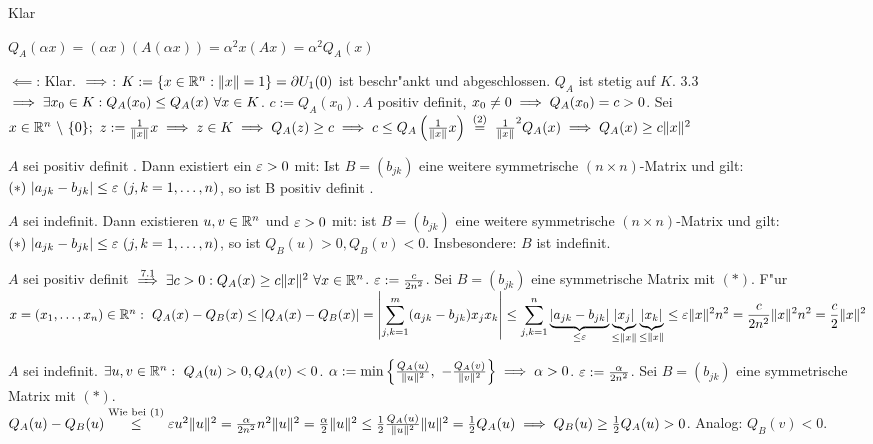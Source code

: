 \documentclass[a4paper,twoside,DIV15,BCOR12mm,chapterprefix=true,headings=twolinechapter]{scrbook}
\begin{document}
\begin{beweise}
\item Klar
\item $Q_A(\alpha x)=(\alpha x)(A(\alpha x))=\alpha^2x(Ax)=\alpha^2Q_A(x)$
\item \glqq$\impliedby$\grqq: Klar. \glqq$\implies$\grqq: $K:=\{x\in\mathbb{R}^n: \|x\|=1\}=\partial U_1(0)$ ist beschr"ankt und abgeschlossen. $Q_A$ ist stetig auf $K$. 3.3 $\implies\exists x_0\in K: Q_A(x_0)\le Q_A(x)\ \forall x\in K$. $c:=Q_A(x_0).\ A$ positiv definit, $x_0\ne 0\implies Q_A(x_0)=c>0$. Sei $x\in\MdR^n\ \backslash\ \{0\};\ z:=\frac{1}{\|x\|}x\folgt z\in K\folgt Q_A(z)\ge c\folgt c \le Q_A\left(\frac{1}{\|x\|}x\right)\gleichnach{(2)}\frac{1}{\|x\|}^2Q_A(x)\folgt Q_A(x)\ge c\|x\|^2$
\end{beweise}

\begin{satz}
\begin{liste}
\item $A$ sei positiv definit . Dann existiert ein $\varepsilon>0$ mit: Ist $B=(b_{jk})$ eine weitere symmetrische $(n\times n)$-Matrix und gilt: $(*)\ |a_{jk}-b_{jk}|\le\ep\ (j,k=1,\ldots, n)$, so ist B positiv definit .
\item $A$ sei indefinit. Dann existieren $u,v\in\mathbb{R}^n$ und $\varepsilon>0$ mit: ist $B=(b_{jk})$ eine weitere symmetrische $(n\times n)$-Matrix und gilt: $(*)\ |a_{jk}-b_{jk}|\le\ep\ (j,k=1,\ldots,n)$, so ist $Q_B(u)>0, Q_B(v)<0$. Insbesondere: $B$ ist indefinit.
\end{liste}
\end{satz}

\begin{beweise}
\item $A$ sei positiv definit $\folgtnach{7.1}\exists c>0: Q_A(x)\ge c\|x\|^2\ \forall x\in\MdR^n$. $\varepsilon:=\frac{c}{2n^2}$. Sei $B=(b_{jk})$ eine symmetrische Matrix mit $(*)$. F"ur $x=(x_1,\ldots,x_n)\in\MdR^n:\ Q_A(x)-Q_B(x)\le|Q_A(x)-Q_B(x)|=\left|\ds\sum_{j,k=1}^m(a_{jk}-b_{jk})x_jx_k\right|\le\ds\sum_{j,k=1}^n\underbrace{|a_{jk}-b_{jk}|}_{\le\ep}\underbrace{|x_j|}_{\le\|x\|}\underbrace{|x_k|}_{\le\|x\|}\le\ep\|x\|^2n^2=\frac{c}{2n^2}\|x\|^2n^2=\frac{c}{2}\|x\|^2$
\item $A$ sei indefinit. $\exists u,v\in\MdR^n:\ Q_A(u)>0, Q_A(v)<0$. $\alpha:=\min\left\{\frac{Q_A(u)}{\|u\|^2},\ -\frac{Q_A(v)}{\|v\|^2}\right\}\folgt\alpha>0$. $\varepsilon:=\frac{\alpha}{2n^2}$. Sei $B=(b_{jk})$ eine symmetrische Matrix mit $(*)$.\\
$Q_A(u)-Q_B(u)\overset{\text{Wie bei (1)}}{\le}\varepsilon u^2\|u\|^2=\frac{\alpha}{2n^2}n^2\|u\|^2=\frac{\alpha}{2}\|u\|^2\le\frac{1}{2}\frac{Q_A(u)}{\|u\|^2}\|u\|^2=\frac{1}{2}Q_A(u) \implies Q_B(u)\ge\frac{1}{2}Q_A(u)>0$. Analog: $Q_B(v)<0$.
\end{beweise}
\end{document}
